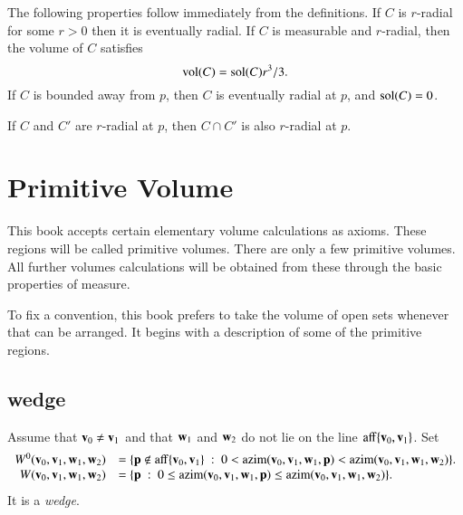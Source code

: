 The following properties follow immediately from the definitions.
If $C$ is $r$-radial for some $r>0$ then it is eventually radial.
If $C$ is measurable and $r$-radial, then the volume of $C$
satisfies
    $$
    {\operatorname{vol}}(C) = {\operatorname{sol}}(C) r^3/3.
    $$
If $C$ is bounded away from $p$, then $C$ is eventually radial at
$p$, and ${\operatorname{sol}}(C) = 0$.
%

\begin{lemma}  If $C$ and $C'$ are  $r$-radial
at $p$, then $C\cap C'$ is also $r$-radial at
$p$.
\end{lemma}






\section{Primitive Volume}
%

This book accepts
certain elementary volume calculations as axioms.  
These regions will be called primitive volumes.  There are only
a few primitive volumes.
All further
volumes calculations will be obtained from these through the basic
properties of measure.   

To fix a convention, this book prefers to take the volume of open sets whenever that can be arranged.  It begins with a description of some of the primitive regions.

\subsection{wedge}
%


\begin{definition}[wedge]
Assume that ${\mathbf v}_0\ne {\mathbf v}_1$ and that
${\mathbf w}_1$ and ${\mathbf w}_2$ do not lie on
the line ${\operatorname{aff}}\{{\mathbf v}_0,{\mathbf v}_1\}$.  Set
$$
\begin{array}{rll}
W^0({\mathbf v}_0,{\mathbf v}_1,{\mathbf w}_1,{\mathbf w}_2) &= 
  \{{\mathbf p}\not\in{\operatorname{aff}}\{{\mathbf v}_0,{\mathbf v}_1\} \ :\  
  0< {\operatorname{azim}}({\mathbf v}_0,{\mathbf v}_1,{\mathbf w}_1,{\mathbf p}) < {\operatorname{azim}}({\mathbf v}_0,{\mathbf v}_1,{\mathbf w}_1,{\mathbf w}_2)\}.\\
W({\mathbf v}_0,{\mathbf v}_1,{\mathbf w}_1,{\mathbf w}_2) &= 
  \{{\mathbf p} \ :\  
  0\le {\operatorname{azim}}({\mathbf v}_0,{\mathbf v}_1,{\mathbf w}_1,{\mathbf p}) \le {\operatorname{azim}}({\mathbf v}_0,{\mathbf v}_1,{\mathbf w}_1,{\mathbf w}_2)\}.\\
\end{array}
$$
It is a {\it wedge}.
\end{definition}

